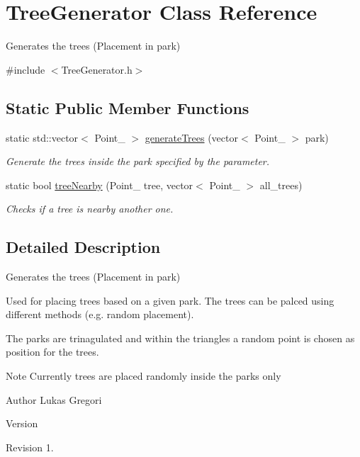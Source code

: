 \hypertarget{class_tree_generator}{}\section{Tree\+Generator Class Reference}
\label{class_tree_generator}


Generates the trees (Placement in park)  




{\ttfamily \#include $<$Tree\+Generator.\+h$>$}

\subsection*{Static Public Member Functions}
\begin{DoxyCompactItemize}
\item 
static std\+::vector$<$ Point\+\_ $>$ \hyperlink{class_tree_generator_af5688087b3d43a0abd62716e8ae8fa18}{generate\+Trees} (vector$<$ Point\+\_ $>$ park)
\begin{DoxyCompactList}\small\item\em Generate the trees inside the park specified by the parameter. \end{DoxyCompactList}\item 
static bool \hyperlink{class_tree_generator_a580ff42e61ae496662683d61383916b6}{tree\+Nearby} (Point\+\_ tree, vector$<$ Point\+\_ $>$ all\+\_\+trees)
\begin{DoxyCompactList}\small\item\em Checks if a tree is nearby another one. \end{DoxyCompactList}\end{DoxyCompactItemize}


\subsection{Detailed Description}
Generates the trees (Placement in park) 

Used for placing trees based on a given park. The trees can be palced using different methods (e.\+g. random placement).

The parks are trinagulated and within the triangles a random point is chosen as position for the trees.

\begin{DoxyNote}{Note}
Currently trees are placed randomly inside the parks only
\end{DoxyNote}
\begin{DoxyAuthor}{Author}
Lukas Gregori 
\end{DoxyAuthor}
\begin{DoxyVersion}{Version}

\end{DoxyVersion}
\begin{DoxyParagraph}{Revision}
1. 
\end{DoxyParagraph}



